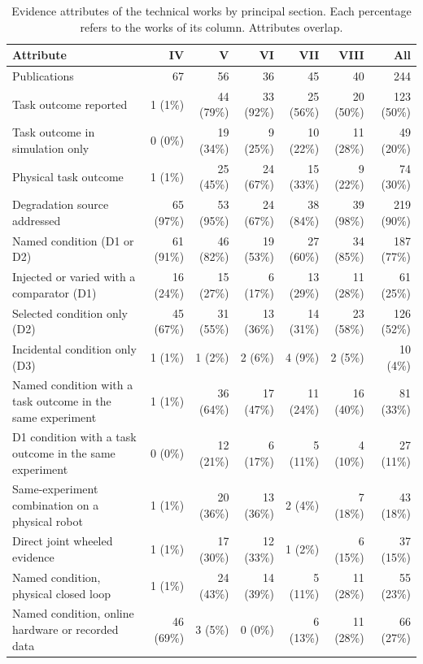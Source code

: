 \begin{table}[!t]
\centering
\caption{Evidence attributes of the technical works by principal section. Each percentage refers to the works of its column. Attributes overlap.}
\label{tab:evidence-percent}
\surveytableformat
\setlength{\tabcolsep}{3.4pt}
\begin{tabularx}{\linewidth}{@{}Yrrrrrr@{}}
\toprule
\textbf{Attribute} & \textbf{IV} & \textbf{V} & \textbf{VI} & \textbf{VII} & \textbf{VIII} & \textbf{All} \\
\midrule
Publications & 67 & 56 & 36 & 45 & 40 & 244 \\
Task outcome reported & 1 (1\%) & 44 (79\%) & 33 (92\%) & 25 (56\%) & 20 (50\%) & 123 (50\%) \\
Task outcome in simulation only & 0 (0\%) & 19 (34\%) & 9 (25\%) & 10 (22\%) & 11 (28\%) & 49 (20\%) \\
Physical task outcome & 1 (1\%) & 25 (45\%) & 24 (67\%) & 15 (33\%) & 9 (22\%) & 74 (30\%) \\
Degradation source addressed & 65 (97\%) & 53 (95\%) & 24 (67\%) & 38 (84\%) & 39 (98\%) & 219 (90\%) \\
Named condition (D1 or D2) & 61 (91\%) & 46 (82\%) & 19 (53\%) & 27 (60\%) & 34 (85\%) & 187 (77\%) \\
Injected or varied with a comparator (D1) & 16 (24\%) & 15 (27\%) & 6 (17\%) & 13 (29\%) & 11 (28\%) & 61 (25\%) \\
Selected condition only (D2) & 45 (67\%) & 31 (55\%) & 13 (36\%) & 14 (31\%) & 23 (58\%) & 126 (52\%) \\
Incidental condition only (D3) & 1 (1\%) & 1 (2\%) & 2 (6\%) & 4 (9\%) & 2 (5\%) & 10 (4\%) \\
Named condition with a task outcome in the same experiment & 1 (1\%) & 36 (64\%) & 17 (47\%) & 11 (24\%) & 16 (40\%) & 81 (33\%) \\
D1 condition with a task outcome in the same experiment & 0 (0\%) & 12 (21\%) & 6 (17\%) & 5 (11\%) & 4 (10\%) & 27 (11\%) \\
Same-experiment combination on a physical robot & 1 (1\%) & 20 (36\%) & 13 (36\%) & 2 (4\%) & 7 (18\%) & 43 (18\%) \\
Direct joint wheeled evidence & 1 (1\%) & 17 (30\%) & 12 (33\%) & 1 (2\%) & 6 (15\%) & 37 (15\%) \\
Named condition, physical closed loop & 1 (1\%) & 24 (43\%) & 14 (39\%) & 5 (11\%) & 11 (28\%) & 55 (23\%) \\
Named condition, online hardware or recorded data & 46 (69\%) & 3 (5\%) & 0 (0\%) & 6 (13\%) & 11 (28\%) & 66 (27\%) \\

\end{tabularx}
\end{table}
